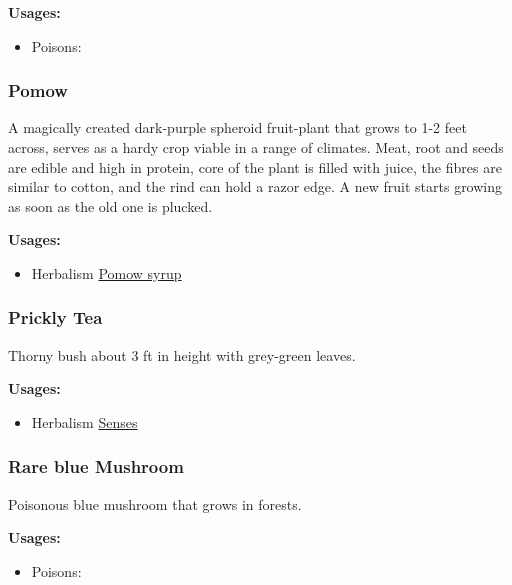 \textbf{Usages:}

\begin{itemize}[noitemsep]
\item[] Poisons: \poison
\end{itemize}

\subsubsection{Pomow}
\label{Pomow}

A magically created dark-purple spheroid fruit-plant that grows to 1-2 feet across, serves as a hardy crop viable in a range of climates. Meat, root and seeds are edible and high in protein, core of the plant is filled with juice, the fibres are similar to cotton, and the rind can hold a razor edge. A new fruit starts growing as soon as the old one is plucked.

\vspace{5mm}

\textbf{Usages:}

\begin{itemize}[noitemsep]
\item[] Herbalism \hyperref[Pomow syrup]{Pomow syrup}
\end{itemize}

\subsubsection{Prickly Tea}
\label{Prickly Tea}

Thorny bush about 3 ft in height with grey-green leaves.

\vspace{5mm}

\textbf{Usages:}

\begin{itemize}[noitemsep]
\item[] Herbalism \hyperref[Senses]{Senses}
\end{itemize}

\subsubsection{Rare blue Mushroom}
\label{Rare blue Mushroom}

Poisonous blue mushroom that grows in forests.

\vspace{5mm}

\textbf{Usages:}

\begin{itemize}[noitemsep]
\item[] Poisons: \poison
\end{itemize}

